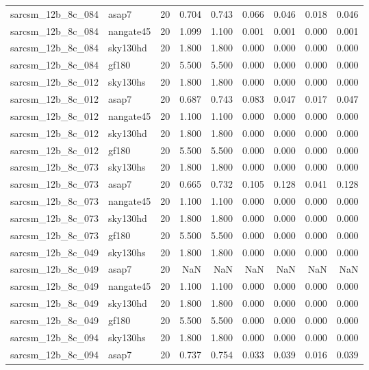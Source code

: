 \begin{tabular}{llrrrrrrr}
sarcsm\_12b\_8c\_084 & asap7 & 20 & 0.704 & 0.743 & 0.066 & 0.046 & 0.018 & 0.046 \\
sarcsm\_12b\_8c\_084 & nangate45 & 20 & 1.099 & 1.100 & 0.001 & 0.001 & 0.000 & 0.001 \\
sarcsm\_12b\_8c\_084 & sky130hd & 20 & 1.800 & 1.800 & 0.000 & 0.000 & 0.000 & 0.000 \\
sarcsm\_12b\_8c\_084 & gf180 & 20 & 5.500 & 5.500 & 0.000 & 0.000 & 0.000 & 0.000 \\
sarcsm\_12b\_8c\_012 & sky130hs & 20 & 1.800 & 1.800 & 0.000 & 0.000 & 0.000 & 0.000 \\
sarcsm\_12b\_8c\_012 & asap7 & 20 & 0.687 & 0.743 & 0.083 & 0.047 & 0.017 & 0.047 \\
sarcsm\_12b\_8c\_012 & nangate45 & 20 & 1.100 & 1.100 & 0.000 & 0.000 & 0.000 & 0.000 \\
sarcsm\_12b\_8c\_012 & sky130hd & 20 & 1.800 & 1.800 & 0.000 & 0.000 & 0.000 & 0.000 \\
sarcsm\_12b\_8c\_012 & gf180 & 20 & 5.500 & 5.500 & 0.000 & 0.000 & 0.000 & 0.000 \\
sarcsm\_12b\_8c\_073 & sky130hs & 20 & 1.800 & 1.800 & 0.000 & 0.000 & 0.000 & 0.000 \\
sarcsm\_12b\_8c\_073 & asap7 & 20 & 0.665 & 0.732 & 0.105 & 0.128 & 0.041 & 0.128 \\
sarcsm\_12b\_8c\_073 & nangate45 & 20 & 1.100 & 1.100 & 0.000 & 0.000 & 0.000 & 0.000 \\
sarcsm\_12b\_8c\_073 & sky130hd & 20 & 1.800 & 1.800 & 0.000 & 0.000 & 0.000 & 0.000 \\
sarcsm\_12b\_8c\_073 & gf180 & 20 & 5.500 & 5.500 & 0.000 & 0.000 & 0.000 & 0.000 \\
sarcsm\_12b\_8c\_049 & sky130hs & 20 & 1.800 & 1.800 & 0.000 & 0.000 & 0.000 & 0.000 \\
sarcsm\_12b\_8c\_049 & asap7 & 20 & NaN & NaN & NaN & NaN & NaN & NaN \\
sarcsm\_12b\_8c\_049 & nangate45 & 20 & 1.100 & 1.100 & 0.000 & 0.000 & 0.000 & 0.000 \\
sarcsm\_12b\_8c\_049 & sky130hd & 20 & 1.800 & 1.800 & 0.000 & 0.000 & 0.000 & 0.000 \\
sarcsm\_12b\_8c\_049 & gf180 & 20 & 5.500 & 5.500 & 0.000 & 0.000 & 0.000 & 0.000 \\
sarcsm\_12b\_8c\_094 & sky130hs & 20 & 1.800 & 1.800 & 0.000 & 0.000 & 0.000 & 0.000 \\
sarcsm\_12b\_8c\_094 & asap7 & 20 & 0.737 & 0.754 & 0.033 & 0.039 & 0.016 & 0.039 \\

\end{tabular}
